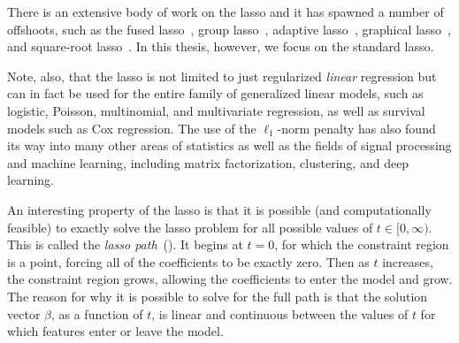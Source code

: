 There is an extensive body of work on the lasso and it has spawned a number of offshoots, such as the fused lasso~\parencite{tibshirani2005}, group lasso~\parencite{yuan2005}, adaptive lasso~\parencite{zou2006}, graphical lasso~\parencite{friedman2008}, and square-root lasso~\parencite{belloni2011}. In this thesis, however, we focus on the standard lasso.

Note, also, that the lasso is not limited to just regularized \emph{linear} regression but can in fact be used for the entire family of generalized linear models, such as logistic, Poisson, multinomial, and multivariate regression, as well as survival models such as Cox regression. The use of the \(\ell_1\)-norm penalty has also found its way into many other areas of statistics as well as the fields of signal processing and machine learning, including matrix factorization, clustering, and deep learning.

An interesting property of the lasso is that it is possible (and computationally feasible) to exactly solve the lasso problem for all possible values of \(t \in [0, \infty)\). This is called the \emph{lasso path}~(). It begins at \(t=0\), for which the constraint region is a point, forcing all of the coefficients to be exactly zero. Then as \(t\) increases, the constraint region grows, allowing the coefficients to enter the model and grow. The reason for why it is possible to solve for the full path is that the solution vector \(\beta\), as a function of \(t\), is linear and continuous between the values of \(t\) for which features enter or leave the model.

